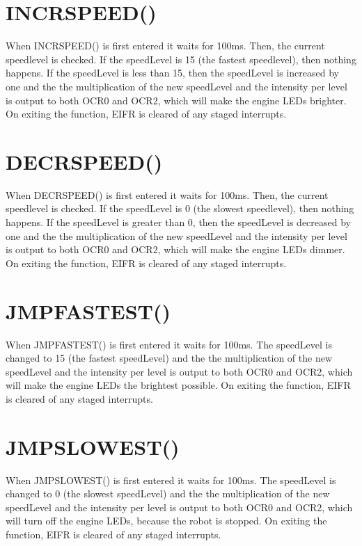 \documentclass[12pt,letterpaper]{article}
\begin{document}
\section{INCRSPEED()}
	When INCRSPEED() is first entered it waits for 100ms.
	Then, the current speedlevel is checked.
	If the speedLevel is 15 (the fastest speedlevel), then nothing happens.
	If the speedLevel is less than 15, then the speedLevel is increased by one and the the multiplication of the new speedLevel and the intensity per level is output to both OCR0 and OCR2, which will make the engine LEDs brighter.
	On exiting the function, EIFR is cleared of any staged interrupts.
	
	
	
\section{DECRSPEED()}
	When DECRSPEED() is first entered it waits for 100ms.
	Then, the current speedlevel is checked.
	If the speedLevel is 0 (the slowest speedlevel), then nothing happens.
	If the speedLevel is greater than 0, then the speedLevel is decreased by one and the the multiplication of the new speedLevel and the intensity per level is output to both OCR0 and OCR2, which will make the engine LEDs dimmer.
	On exiting the function, EIFR is cleared of any staged interrupts.

\section{JMPFASTEST()}
	When JMPFASTEST() is first entered it waits for 100ms.
	The speedLevel is changed to 15 (the fastest speedLevel) and the the multiplication of the new speedLevel and the intensity per level is output to both OCR0 and OCR2, which will make the engine LEDs the brightest possible.
	On exiting the function, EIFR is cleared of any staged interrupts.

\section{JMPSLOWEST()}
	When JMPSLOWEST() is first entered it waits for 100ms.
	The speedLevel is changed to 0 (the slowest speedLevel) and the the multiplication of the new speedLevel and the intensity per level is output to both OCR0 and OCR2, which will turn off the engine LEDs, because the robot is stopped.
	On exiting the function, EIFR is cleared of any staged interrupts.
	
\end{document}

